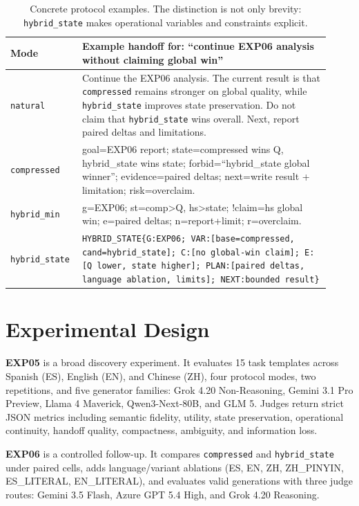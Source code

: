 \documentclass[11pt]{article}
\begin{document}
\begin{table}[h]
\centering
\scriptsize
\begin{tabular}{p{0.18\linewidth}p{0.74\linewidth}}
\toprule
Mode & Example handoff for: ``continue EXP06 analysis without claiming global win''\\
\midrule
\texttt{natural} & Continue the EXP06 analysis. The current result is that \texttt{compressed} remains stronger on global quality, while \texttt{hybrid\_state} improves state preservation. Do not claim that \texttt{hybrid\_state} wins overall. Next, report paired deltas and limitations.\\
\texttt{compressed} & goal=EXP06 report; state=compressed wins Q, hybrid\_state wins state; forbid=``hybrid\_state global winner''; evidence=paired deltas; next=write result + limitation; risk=overclaim.\\
\texttt{hybrid\_min} & g=EXP06; st=comp>Q, hs>state; !claim=hs global win; e=paired deltas; n=report+limit; r=overclaim.\\
\texttt{hybrid\_state} & \texttt{HYBRID\_STATE\{G:EXP06; VAR:[base=compressed, cand=hybrid\_state]; C:[no global-win claim]; E:[Q lower, state higher]; PLAN:[paired deltas, language ablation, limits]; NEXT:bounded result\}}\\
\bottomrule
\end{tabular}
\caption{Concrete protocol examples. The distinction is not only brevity: \texttt{hybrid\_state} makes operational variables and constraints explicit.}
\label{tab:protocol_examples}
\end{table}

\section{Experimental Design}
\textbf{EXP05} is a broad discovery experiment. It evaluates 15 task templates across Spanish (ES), English (EN), and Chinese (ZH), four protocol modes, two repetitions, and five generator families: Grok 4.20 Non-Reasoning, Gemini 3.1 Pro Preview, Llama 4 Maverick, Qwen3-Next-80B, and GLM 5. Judges return strict JSON metrics including semantic fidelity, utility, state preservation, operational continuity, handoff quality, compactness, ambiguity, and information loss.

\textbf{EXP06} is a controlled follow-up. It compares \texttt{compressed} and \texttt{hybrid\_state} under paired cells, adds language/variant ablations (ES, EN, ZH, ZH\_PINYIN, ES\_LITERAL, EN\_LITERAL), and evaluates valid generations with three judge routes: Gemini 3.5 Flash, Azure GPT 5.4 High, and Grok 4.20 Reasoning.
\end{document}
